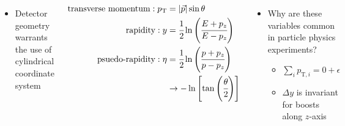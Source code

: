 \begin{frame}
\begin{columns}
    \begin{itemize}
    \item Detector geometry warrants the use of cylindrical coordinate system
    \end{itemize}
    \begin{align*}
      \text{transverse momentum} : p_{\text{T}} &= \left|\vec{p}\right| \sin\theta \\
      \text{rapidity} : y &= \cfrac{1}{2} \ln \left( \cfrac{E + p_z}{E - p_z} \right)
      \\
      \text{psuedo-rapidity} :\eta &= \cfrac{1}{2} \ln \left( \cfrac{p + p_z}{p - p_z} \right) \\
      & \to -\ln \left[ \tan\left(\cfrac{\theta}{2}\right) \right]
    \end{align*}
    \begin{itemize}
    \item Why are these variables common in particle physics experiments?
      \begin{itemize}
      \item $\sum_{i} p_{\text{T},i} = 0 + \epsilon$
      \item $\Delta y$ is invariant for boosts along $z$-axis
      \end{itemize}
    \end{itemize}
  \end{columns}
  
  
\end{frame}
